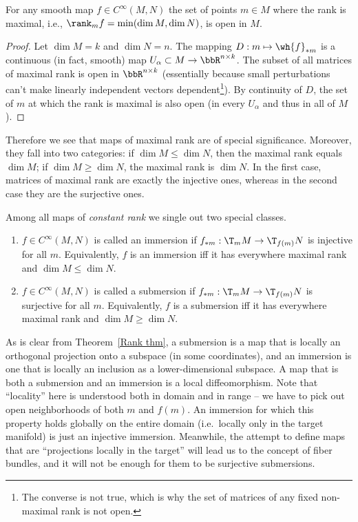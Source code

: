 \begin{prop}\label{domain of maximal rank}
    For any smooth map $f\in C^\infty (M,N)$ the set of points $m\in M$ where the rank is maximal, i.e., $\rank_m f=\min(\dim M,\dim N)$, is open in $M$.
\end{prop}
\begin{proof}
    Let $\dim M=k$ and $\dim N=n$. The mapping $D:m\mapsto \wh{f}_{\ast m}$ is a continuous (in fact, smooth) map $U_\alpha\subset M\to \bbR^{n\times k}$. The subset of all matrices of maximal rank is open in $\bbR^{n\times k}$ (essentially because small perturbations can't make linearly independent vectors dependent\footnote{The converse is not true, which is why the set of matrices of any fixed non-maximal rank is not open.}). By continuity of $D$, the set of $m$ at which the rank is maximal is also open (in every $U_\alpha$ and thus in all of $M$).
\end{proof}

Therefore we see that maps of maximal rank are of special significance. Moreover, they fall into two categories: if $\dim M\leq \dim N$, then the maximal rank equals $\dim M$; if $\dim M\geq \dim N$, the maximal rank is $\dim N$. In the first case, matrices of maximal rank are exactly the injective ones, whereas in the second case they are the surjective ones.

\begin{defn}
    Among all maps of \emph{constant rank} we single out two special classes.
\begin{enumerate}
    \item $f\in C^\infty(M,N)$ is called an immersion if $f_{\ast m}:\T_m  M\to \T_{f(m)} N$ is injective for all $m$. Equivalently, $f$ is an immersion iff it has everywhere maximal rank and $\dim M\leq \dim N$.
    \item $f\in C^\infty(M,N)$ is called a submersion if $f_{\ast m}:\T_m  M\to \T_{f(m)} N$ is surjective for all $m$. Equivalently, $f$ is a submersion iff it has everywhere maximal rank and $\dim M\geq \dim N$.
\end{enumerate}
\end{defn}

\begin{rem}
    As is clear from Theorem~\ref{Rank thm}, a submersion is a map that is locally an orthogonal projection onto a subspace (in some coordinates), and an immersion is one that is locally an inclusion as a lower-dimensional subspace. A map that is both a submersion and an immersion is a local diffeomorphism. Note that ``locality'' here is understood both in domain and in range -- we have to pick out open neighborhoods of both $m$ and $f(m)$. An immersion for which this property holds globally on the entire domain (i.e.~locally only in the target manifold) is just an injective immersion. Meanwhile, the attempt to define maps that are ``projections locally in the target'' will lead us to the concept of fiber bundles, and it will not be enough for them to be surjective submersions.
\end{rem}


